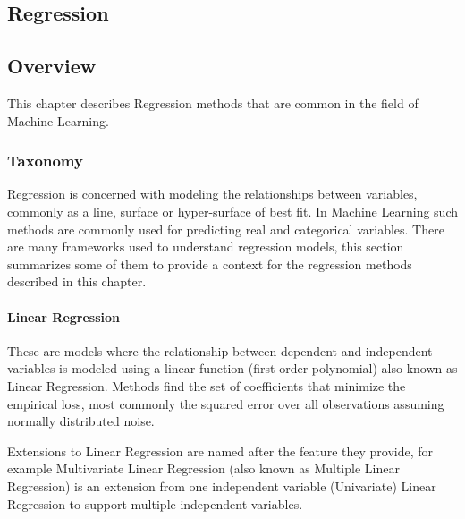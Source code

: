 

\renewcommand{\bibsection}{\subsection{\bibname}}
\begin{bibunit}

\chapter{Regression}
\label{ch:regression}

\section{Overview}
This chapter describes Regression methods that are common in the field of Machine Learning.

\subsection{Taxonomy}
Regression is concerned with modeling the relationships between variables, commonly as a line, surface or hyper-surface of best fit. In Machine Learning such methods are commonly used for predicting real and categorical variables. There are many frameworks used to understand regression models, this section summarizes some of them to provide a context for the regression methods described in this chapter.

\subsubsection{Linear Regression}
These are models where the relationship between dependent and independent variables is modeled using a linear function (first-order polynomial) also known as Linear Regression. Methods find the set of coefficients that minimize the empirical loss, most commonly the squared error over all observations assuming normally distributed noise.

Extensions to Linear Regression are named after the feature they provide, for example Multivariate Linear Regression (also known as Multiple Linear Regression) is an extension from one independent variable (Univariate) Linear Regression to support multiple independent variables.


\end{bibunit}
